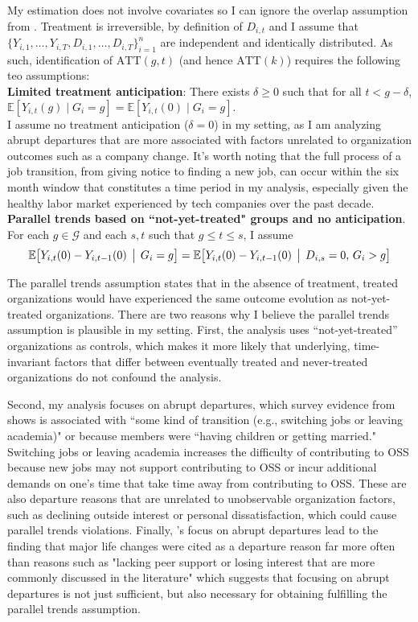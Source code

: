\documentclass[12pt,notitlepage]{article}
\begin{document}
My estimation does not involve covariates so I can ignore the overlap assumption from \cite{callaway_difference--differences_2021}. Treatment is irreversible, by definition of $D_{i,t}$ and I assume that $\{Y_{i,1},\dots,Y_{i,T},D_{i,1},\dots,D_{i,T}\}_{i=1}^n$ are independent and identically distributed. As such, identification of $\mathrm{ATT}(g,t)$ (and hence $\mathrm{ATT}(k)$) requires the following teo assumptions:\\
\textbf{Limited treatment anticipation}: There exists $\delta\ge0$ such that for all $t<g-\delta$, $\mathbb{E}[Y_{i,t}(g)\mid G_i=g] = \mathbb{E}[Y_{i,t}(0)\mid G_i=g].$\\
I assume no treatment anticipation ($\delta=0$) in my setting, as I am analyzing abrupt departures that are more associated with factors unrelated to organization outcomes such as a company change. It's worth noting that the full process of a job transition, from giving notice to finding a new job, can occur within the six month window that constitutes a time period in my analysis, especially given the healthy labor market experienced by tech companies over the past decade.\\
\textbf{Parallel trends based on ``not-yet-treated" groups and no anticipation}. For each $g\in\mathcal{G}$ and each $s, t$ such that $g \leq t \leq s$, I assume \[\mathbb{E}\bigl[Y_{i,t}(0)-Y_{i,t-1}(0)\,\bigm|\,G_i = g\bigr] =\mathbb{E}\bigl[Y_{i,t}(0)-Y_{i,t-1}(0)\,\bigm|\,D_{i,s}=0,\,G_i > g\bigr]\]

The parallel trends assumption states that in the absence of treatment, treated organizations would have experienced the same outcome evolution as not-yet-treated organizations. 
There are two reasons why I believe the parallel trends assumption is plausible in my setting. First, the analysis uses ``not-yet-treated'' organizations as controls, which makes it more likely that underlying, time-invariant factors that differ between eventually treated and never-treated organizations do not confound the analysis. 

Second, my analysis focuses on abrupt departures, which survey evidence from \cite{miller_why_2019} shows is associated with ``some kind of transition (e.g., switching jobs or leaving academia)" or because members were ``having children or getting married." Switching jobs or leaving academia increases the difficulty of contributing to OSS because new jobs may not support contributing to OSS or incur additional demands on one's time that take time away from contributing to OSS. These are also departure reasons that are unrelated to unobservable organization factors, such as declining outside interest or personal dissatisfaction, which could cause parallel trends violations. Finally, \cite{miller_why_2019}'s focus on abrupt departures lead to the finding that major life changes were cited as a departure reason far more often than reasons such as "lacking peer support or losing interest that are more commonly discussed in the literature" which suggests that focusing on abrupt departures is not just sufficient, but also necessary for obtaining fulfilling the parallel trends assumption. 
\end{document}
